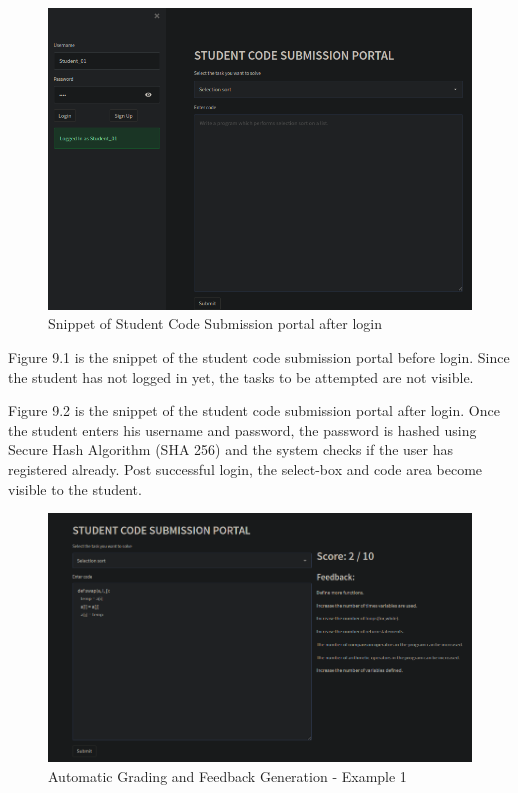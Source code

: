 \begin{figure}[h!]
\centering
\includegraphics[scale=0.5]{./figures/dep2.png}
\caption{Snippet of Student Code Submission portal after login}
\label{fig2}
\end{figure}

\newpage
\newpage
Figure 9.1 is the snippet of the student code submission portal before login. Since the student has not logged in yet, the tasks to be attempted are not visible.

Figure 9.2 is the snippet of the student code submission portal after login. Once the student enters his username and password, the password is hashed using Secure Hash Algorithm (SHA 256) and the system checks if the user has registered already. Post successful login, the select-box and code area become visible to the student.  



\begin{figure}[h!]
\centering
\includegraphics[scale=0.5]{./figures/dep3.png}
\caption{Automatic Grading and Feedback Generation - Example 1}
\label{fig3}
\end{figure}

